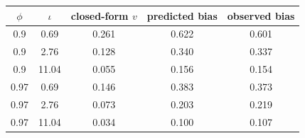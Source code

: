 \begin{tabular}{ccccc}
\toprule
$\phi$ & $\iota$ & closed-form $v$ & predicted bias & observed bias \\
\midrule
0.9 & 0.69 & 0.261 & 0.622 & 0.601 \\
0.9 & 2.76 & 0.128 & 0.340 & 0.337 \\
0.9 & 11.04 & 0.055 & 0.156 & 0.154 \\
0.97 & 0.69 & 0.146 & 0.383 & 0.373 \\
0.97 & 2.76 & 0.073 & 0.203 & 0.219 \\
0.97 & 11.04 & 0.034 & 0.100 & 0.107 \\
\bottomrule
\end{tabular}
